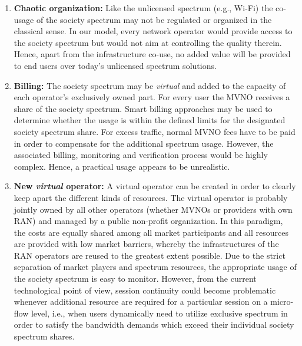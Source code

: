 \documentclass[conference]{IEEEtran}
\begin{document}
\begin{enumerate}
\item \textbf{Chaotic organization:} Like the unlicensed spectrum (e.g., Wi-Fi) the co-usage of the society spectrum may not be regulated or organized in the classical sense. In our model, every network operator would provide access to the society spectrum but would not aim at controlling the quality therein. Hence, apart from the infrastructure co-use, no added value will be provided to end users over today's unlicensed spectrum solutions.





\item \textbf{Billing:} The society spectrum may be \textit{virtual} and added to the capacity of each operator's exclusively owned part. For every user the MVNO receives a share of the society spectrum. Smart billing approaches may be used to determine whether the usage is within the defined limits for the designated society spectrum share. For excess traffic, normal MVNO fees have to be paid in order to compensate for the additional spectrum usage. However, the associated billing, monitoring and verification process would be highly complex. Hence, a practical usage appears to be unrealistic.

\item \textbf{New \textit{virtual} operator:} A virtual operator can be created in order to clearly keep apart the different kinds of resources. The virtual operator is probably jointly owned by all other operators (whether MVNOs or providers with own RAN) and managed by a public non-profit organization. In this paradigm, the costs are equally shared among all market participants and all resources are provided with low market barriers, whereby the infrastructures of the RAN operators are reused to the greatest extent possible. Due to the strict separation of market players and spectrum resources, the appropriate usage of the society spectrum is easy to monitor. However, from the current technological point of view, session continuity could become problematic whenever additional resource are required for a particular session on a micro-flow level, i.e., when users dynamically need to utilize exclusive spectrum in order to satisfy the bandwidth demands which exceed their individual society spectrum shares.








\end{enumerate}
\end{document}
